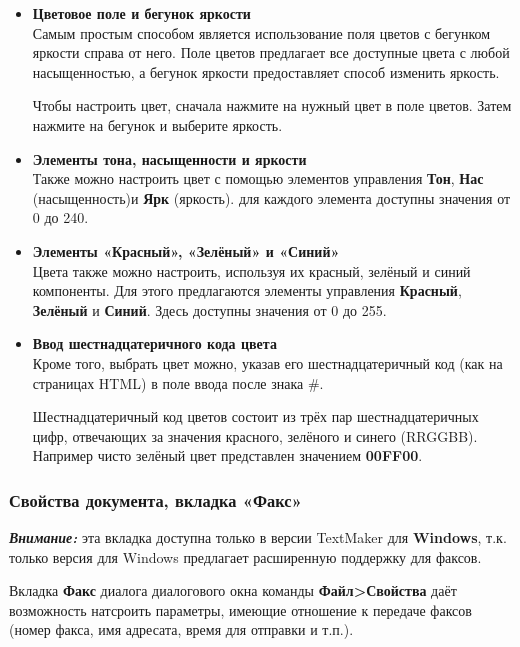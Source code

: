 ﻿\documentclass[a4paper,10pt]{article}
\begin{document}
 \begin{itemize}
  \item \textbf{Цветовое поле и бегунок яркости}\\
  Самым простым способом является использование поля цветов с бегунком яркости справа от него. Поле цветов предлагает все доступные цвета с любой насыщенностью, а бегунок яркости предоставляет способ изменить яркость.
  
  Чтобы настроить цвет, сначала нажмите на нужный цвет в поле цветов. Затем нажмите на бегунок и выберите яркость.
  \item \textbf{Элементы тона, насыщенности и яркости}\\
  Также можно настроить цвет с помощью элементов управления \textbf{Тон}, \textbf{Нас} (насыщенность)и \textbf{Ярк} (яркость). для каждого элемента доступны значения от 0 до 240.
  \item \textbf{Элементы «Красный», «Зелёный» и «Синий»}\\
  Цвета также можно настроить, используя их красный, зелёный и синий компоненты. Для этого предлагаются элементы управления \textbf{Красный}, \textbf{Зелёный} и \textbf{Синий}. Здесь доступны значения от 0 до 255.
  \item \textbf{Ввод шестнадцатеричного кода цвета}\\
  Кроме того, выбрать цвет можно, указав его шестнадцатеричный код (как на страницах HTML) в поле ввода после знака \#. 
  
  Шестнадцатеричный код цветов состоит из трёх пар шестнадцатеричных цифр, отвечающих за значения красного, зелёного и синего (RRGGBB). Например чисто зелёный цвет представлен значением \textbf{00FF00}.
 \end{itemize}
 
 \subsubsection{Свойства документа, вкладка «Факс»}
 \begin{mdframed}[backgroundcolor=blue!10]
\textbf{\textit{Внимание:}} эта вкладка доступна только в версии TextMaker для \textbf{Windows}, т.к. только версия для Windows предлагает расширенную поддержку для факсов.
\end{mdframed}
 
 Вкладка \textbf{Факс} диалога диалогового окна команды \textbf{Файл>Свойства} даёт возможность натсроить параметры, имеющие отношение к передаче факсов (номер факса, имя адресата, время для отправки и т.п.).
  
\end{document}
